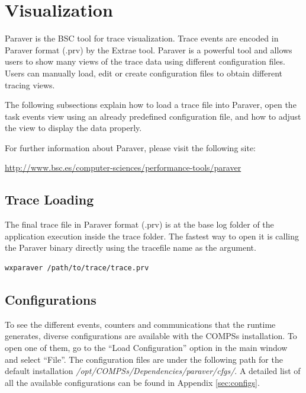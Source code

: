 \section{Visualization}
\label{sec:Visualization}

Paraver is the BSC tool for trace visualization. Trace events are encoded in Paraver format (.prv) by the Extrae tool. Paraver is a powerful tool and allows users to show many views of the trace data using different configuration files. Users can manually load, edit or create configuration files to obtain different tracing views. 

The following subsections explain how to load a trace file into Paraver, open the task events view using an already predefined configuration file, and how to adjust the view to display the data properly.

For further information about Paraver, please visit the following site:

\begin{center}
\url{http://www.bsc.es/computer-sciences/performance-tools/paraver}
\end{center}

\subsection{Trace Loading}
The final trace file in Paraver format (.prv) is at the base log folder of the application execution inside the trace folder. The fastest way to open it is calling the Paraver binary directly using the tracefile name as the argument.

\begin{lstlisting}[language=bash]
wxparaver /path/to/trace/trace.prv
\end{lstlisting}
 
\subsection{Configurations}

To see the different events, counters and communications that the runtime generates, diverse configurations are available with the COMPSs installation.
To open one of them, go to the ``Load Configuration'' option in the main window and select ``File''. The configuration files are under the following path
for the default installation \textit{/opt/COMPSs/Dependencies/paraver/cfgs/}. A detailed list of all the available configurations can be found in Appendix 
\ref{sec:configs}.

